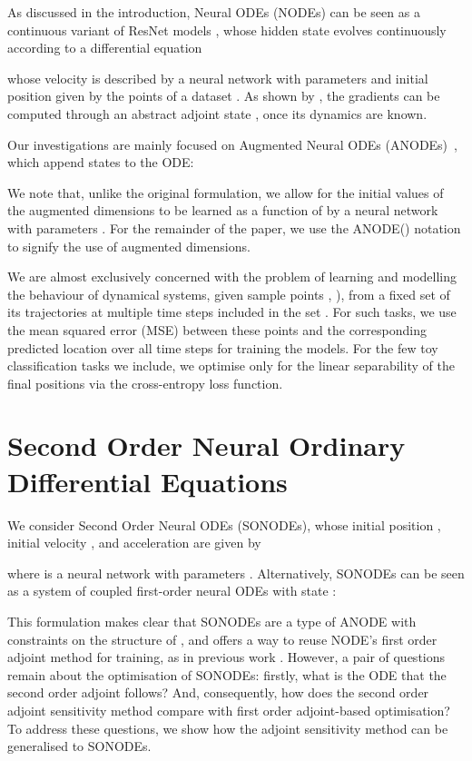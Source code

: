 \documentclass{article}
\theoremstyle{remark}
\theoremstyle{definition}
\begin{document}
As discussed in the introduction, Neural ODEs (NODEs) can be seen as a continuous variant of ResNet models \cite{he2015deep}, whose hidden state evolves continuously according to a differential equation

whose velocity is described by a neural network  with parameters  and initial position given by the points of a dataset . As shown by \citet{chen2018neural}, the gradients can be computed through an abstract adjoint state , once its dynamics are known.  

Our investigations are mainly focused on Augmented Neural ODEs (ANODEs)~\citep{dupont2019augmented}, which append states  to the ODE: 

We note that, unlike the original formulation, we allow for the initial values of the augmented dimensions  to be learned as a function of  by a neural network  with parameters . For the remainder of the paper, we use the ANODE() notation to signify the use of  augmented dimensions. 

We are almost exclusively concerned with the problem of learning and modelling the behaviour of dynamical systems, given  sample points , ), from a fixed set of its trajectories at multiple time steps included in the set . For such tasks, we use the mean squared error (MSE) between these points and the corresponding predicted location over all time steps for training the models. For the few toy classification tasks we include, we optimise only for the linear separability of the final positions via the cross-entropy loss function.

\section{Second Order Neural Ordinary Differential Equations}
\label{sec: sonode}

We consider Second Order Neural ODEs (SONODEs), whose initial position , initial velocity , and acceleration  are given by

where  is a neural network with parameters . Alternatively, SONODEs can be seen as a system of coupled first-order neural ODEs with state :


This formulation makes clear that SONODEs are a type of ANODE with constraints on the structure of , and offers a way to reuse NODE's first order adjoint method \citep{chen2018neural} for training, as in previous work \citep{yldz2019ode2vae, massaroli2020dissecting}. However, a pair of questions remain about the optimisation of SONODEs: firstly, what is the ODE that the second order adjoint follows? And, consequently, how does the second order adjoint sensitivity method compare with first order adjoint-based optimisation? To address these questions, we show how the adjoint sensitivity method can be generalised to SONODEs.
\end{document}
